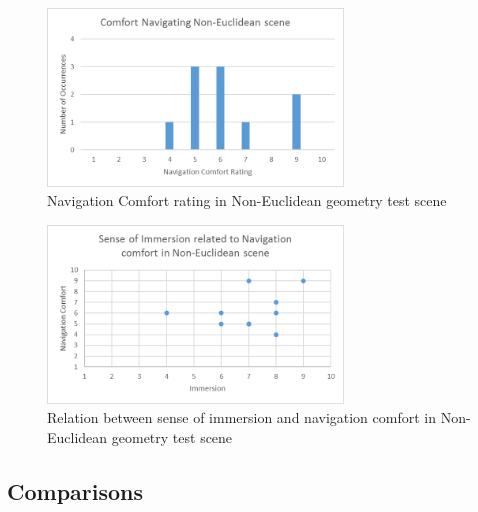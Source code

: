 			\begin{figure}[H]
				\includegraphics[width=0.7\textwidth]{Images/NE_Comfort}
				\centering
				\caption{Navigation Comfort rating in Non-Euclidean geometry test scene}
				\label{exp:fig:ne_comfort}
			\end{figure}

			\begin{figure}[H]
				\includegraphics[width=0.7\textwidth]{Images/NE_Relation}
				\centering
				\caption{Relation between sense of immersion and navigation comfort in Non-Euclidean geometry test scene}
				\label{exp:fig:ne_relation}
			\end{figure}

		\subsection{Comparisons}
		\label{exp:exp:comp}


